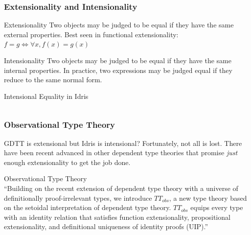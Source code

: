 \documentclass
  [hyperref={colorlinks = true,linkcolor = blue, 
             citecolor = blue, urlcolor = blue}
  ]{beamer}
\begin{document}
\begin{frame}[fragile]
  \frametitle{Extensionality and Intensionality}
  \begin{block}{Extensionality}
  Two objects may be judged to be equal if they have the same
  external properties.
  Best seen in functional extensionality: $f = g \iff \forall x, f(x) = g(x)$
  \end{block}
  
  \begin{block}{Intensionality}
  Two objects may be judged to be equal if they have the same
  internal properties. In practice, two expressions may be 
  judged equal if they reduce to the same normal form.
  \end{block}

  \begin{block}{Intensional Equality in Idris}
  \inputminted{idris}{../Code/src/IntensionalEquality.idr}
  \end{block}
\end{frame}

\begin{frame}[fragile]
  \frametitle{Observational Type Theory}
  \begin{block}{GDTT is extensional but Idris is
  intensional?}
  Fortunately, not all is lost. There have been recent advanced
  in other dependent type theories that promise \textit{just}
  enough extensionality to get the job done.
  \end{block}

  \begin{block}{Observational Type 
    Theory \citep{altenkirch2007observational} \\
    \citep{pujet2022observational}}
    ``Building on the recent extension of dependent type 
      theory with a universe of definitionally 
      proof-irrelevant types, we introduce $TT_{obs}$, a 
      new type theory based on the setoidal interpretation 
      of dependent type theory. $TT_{obs}$ equips every type 
      with an identity relation that satisfies 
      function extensionality, propositional extensionality, 
      and definitional uniqueness of identity proofs (UIP).''
  \end{block}
\end{frame}
\end{document}
